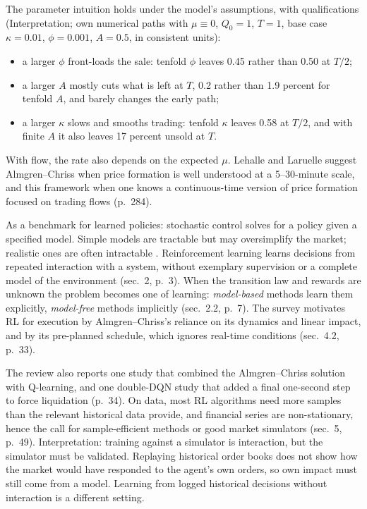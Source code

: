 \begin{qfmodel}
 The parameter intuition holds under the model's assumptions, with qualifications (Interpretation; own numerical paths with $\mu\equiv0$, $Q_0=1$, $T=1$, base case $\kappa=0.01$, $\phi=0.001$, $A=0.5$, in consistent units):
\begin{itemize}
\item a larger $\phi$ front-loads the sale: tenfold $\phi$ leaves 0.45 rather than 0.50 at $T/2$;
\item a larger $A$ mostly cuts what is left at $T$, 0.2 rather than 1.9 percent for tenfold $A$, and barely changes the early path;
\item a larger $\kappa$ slows and smooths trading: tenfold $\kappa$ leaves 0.58 at $T/2$, and with finite $A$ it also leaves 17 percent unsold at $T$.
\end{itemize}
With flow, the rate also depends on the expected $\mu$. Lehalle and Laruelle suggest Almgren--Chriss when price formation is well understood at a 5--30-minute scale, and this framework when one knows a continuous-time version of price formation focused on trading flows (p.~284).

As a benchmark for learned policies: stochastic control solves for a policy given a specified model. Simple models are tractable but may oversimplify the market; realistic ones are often intractable \citep[sec.~1, p.~2]{wide-hambly-xu-yang}. Reinforcement learning learns decisions from repeated interaction with a system, without exemplary supervision or a complete model of the environment (sec.~2, p.~3). When the transition law and rewards are unknown the problem becomes one of learning: \emph{model-based} methods learn them explicitly, \emph{model-free} methods implicitly (sec.~2.2, p.~7). The survey motivates RL for execution by Almgren--Chriss's reliance on its dynamics and linear impact, and by its pre-planned schedule, which ignores real-time conditions (sec.~4.2, p.~33).

The review also reports one study that combined the Almgren--Chriss solution with Q-learning, and one double-DQN study that added a final one-second step to force liquidation (p.~34). On data, most RL algorithms need more samples than the relevant historical data provide, and financial series are non-stationary, hence the call for sample-efficient methods or good market simulators (sec.~5, p.~49). Interpretation: training against a simulator is interaction, but the simulator must be validated. Replaying historical order books does not show how the market would have responded to the agent's own orders, so own impact must still come from a model. Learning from logged historical decisions without interaction is a different setting.


\end{qfmodel}
